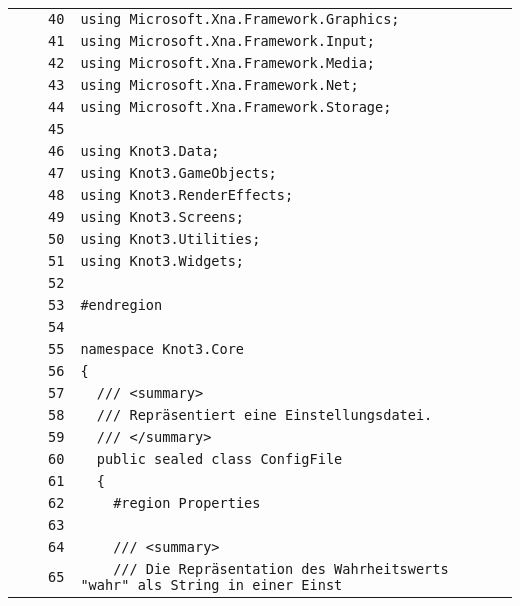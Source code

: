 \documentclass[a4paper,10pt]{article}
\begin{document}
\begin{longtable}[l]{lrrl}
\cellcolor{gray} &  & \verb~40~ & \verb~using Microsoft.Xna.Framework.Graphics;~\\
\cellcolor{gray} &  & \verb~41~ & \verb~using Microsoft.Xna.Framework.Input;~\\
\cellcolor{gray} &  & \verb~42~ & \verb~using Microsoft.Xna.Framework.Media;~\\
\cellcolor{gray} &  & \verb~43~ & \verb~using Microsoft.Xna.Framework.Net;~\\
\cellcolor{gray} &  & \verb~44~ & \verb~using Microsoft.Xna.Framework.Storage;~\\
\cellcolor{gray} &  & \verb~45~ & \verb~~\\
\cellcolor{gray} &  & \verb~46~ & \verb~using Knot3.Data;~\\
\cellcolor{gray} &  & \verb~47~ & \verb~using Knot3.GameObjects;~\\
\cellcolor{gray} &  & \verb~48~ & \verb~using Knot3.RenderEffects;~\\
\cellcolor{gray} &  & \verb~49~ & \verb~using Knot3.Screens;~\\
\cellcolor{gray} &  & \verb~50~ & \verb~using Knot3.Utilities;~\\
\cellcolor{gray} &  & \verb~51~ & \verb~using Knot3.Widgets;~\\
\cellcolor{gray} &  & \verb~52~ & \verb~~\\
\cellcolor{gray} &  & \verb~53~ & \verb~#endregion~\\
\cellcolor{gray} &  & \verb~54~ & \verb~~\\
\cellcolor{gray} &  & \verb~55~ & \verb~namespace Knot3.Core~\\
\cellcolor{gray} &  & \verb~56~ & \verb~{~\\
\cellcolor{gray} &  & \verb~57~ & \verb~  /// <summary>~\\
\cellcolor{gray} &  & \verb~58~ & \verb~  /// Repräsentiert eine Einstellungsdatei.~\\
\cellcolor{gray} &  & \verb~59~ & \verb~  /// </summary>~\\
\cellcolor{gray} &  & \verb~60~ & \verb~  public sealed class ConfigFile~\\
\cellcolor{gray} &  & \verb~61~ & \verb~  {~\\
\cellcolor{gray} &  & \verb~62~ & \verb~    #region Properties~\\
\cellcolor{gray} &  & \verb~63~ & \verb~~\\
\cellcolor{gray} &  & \verb~64~ & \verb~    /// <summary>~\\
\cellcolor{gray} &  & \verb~65~ & \verb~    /// Die Repräsentation des Wahrheitswerts "wahr" als String in einer Einst~\\

\end{longtable}
\end{document}

